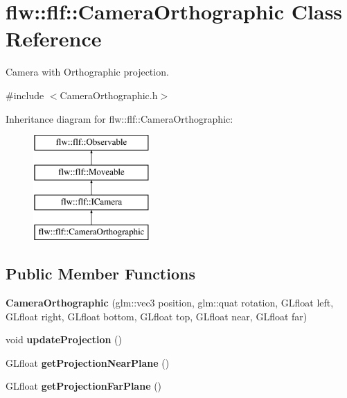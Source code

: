 \hypertarget{classflw_1_1flf_1_1CameraOrthographic}{}\section{flw\+:\+:flf\+:\+:Camera\+Orthographic Class Reference}
\label{classflw_1_1flf_1_1CameraOrthographic}


Camera with Orthographic projection.  




{\ttfamily \#include $<$Camera\+Orthographic.\+h$>$}

Inheritance diagram for flw\+:\+:flf\+:\+:Camera\+Orthographic\+:\begin{figure}[H]
\begin{center}
\leavevmode
\includegraphics[height=4.000000cm]{classflw_1_1flf_1_1CameraOrthographic}
\end{center}
\end{figure}
\subsection*{Public Member Functions}
\begin{DoxyCompactItemize}
\item 
{\bfseries Camera\+Orthographic} (glm\+::vec3 position, glm\+::quat rotation, G\+Lfloat left, G\+Lfloat right, G\+Lfloat bottom, G\+Lfloat top, G\+Lfloat near, G\+Lfloat far)\hypertarget{classflw_1_1flf_1_1CameraOrthographic_af3256954755427e7d30080e4ddbc8bf2}{}\label{classflw_1_1flf_1_1CameraOrthographic_af3256954755427e7d30080e4ddbc8bf2}

\item 
void {\bfseries update\+Projection} ()\hypertarget{classflw_1_1flf_1_1CameraOrthographic_a08256bc028355b465f23750e93718100}{}\label{classflw_1_1flf_1_1CameraOrthographic_a08256bc028355b465f23750e93718100}

\item 
G\+Lfloat {\bfseries get\+Projection\+Near\+Plane} ()\hypertarget{classflw_1_1flf_1_1CameraOrthographic_ab3af2aed92db2745649c2af0fab6c277}{}\label{classflw_1_1flf_1_1CameraOrthographic_ab3af2aed92db2745649c2af0fab6c277}

\item 
G\+Lfloat {\bfseries get\+Projection\+Far\+Plane} ()\hypertarget{classflw_1_1flf_1_1CameraOrthographic_ac1dde1e4ba781656d215348806844837}{}\label{classflw_1_1flf_1_1CameraOrthographic_ac1dde1e4ba781656d215348806844837}

\end{DoxyCompactItemize}
